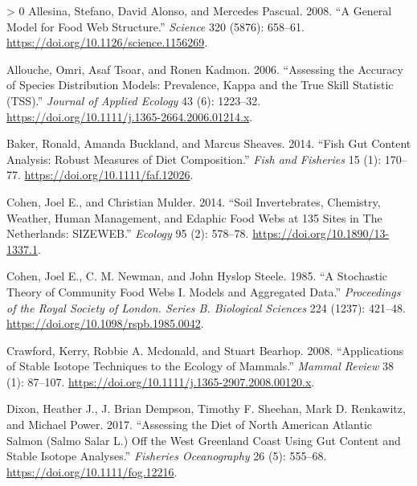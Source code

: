 \documentclass{article}
\newlength{\cslhangindent}
\newenvironment{CSLReferences}[3] %
 {%
  \setlength{\parindent}{0pt}
  \ifodd #1 \everypar{\setlength{\hangindent}{\cslhangindent}}\ignorespaces\fi
  \ifnum #2 > 0
  \setlength{\parskip}{#2\baselineskip}
  \fi
 }%
 {}
\begin{document}
\hypertarget{refs}{}
\begin{CSLReferences}{1}{0}
\leavevmode\hypertarget{ref-allesinaGeneralModelFood2008}{}%
Allesina, Stefano, David Alonso, and Mercedes Pascual. 2008. {``A
{General Model} for {Food Web Structure}.''} \emph{Science} 320 (5876):
658--61. \url{https://doi.org/10.1126/science.1156269}.

\leavevmode\hypertarget{ref-alloucheAssessingAccuracySpecies2006}{}%
Allouche, Omri, Asaf Tsoar, and Ronen Kadmon. 2006. {``Assessing the
Accuracy of Species Distribution Models: Prevalence, Kappa and the True
Skill Statistic ({TSS}).''} \emph{Journal of Applied Ecology} 43 (6):
1223--32. \url{https://doi.org/10.1111/j.1365-2664.2006.01214.x}.

\leavevmode\hypertarget{ref-bakerFishGutContent2014}{}%
Baker, Ronald, Amanda Buckland, and Marcus Sheaves. 2014. {``Fish Gut
Content Analysis: Robust Measures of Diet Composition.''} \emph{Fish and
Fisheries} 15 (1): 170--77. \url{https://doi.org/10.1111/faf.12026}.

\leavevmode\hypertarget{ref-cohenSoilInvertebratesChemistry2014}{}%
Cohen, Joel E., and Christian Mulder. 2014. {``Soil Invertebrates,
Chemistry, Weather, Human Management, and Edaphic Food Webs at 135 Sites
in {The Netherlands}: {SIZEWEB}.''} \emph{Ecology} 95 (2): 578--78.
\url{https://doi.org/10.1890/13-1337.1}.

\leavevmode\hypertarget{ref-cohenStochasticTheoryCommunity1985}{}%
Cohen, Joel E., C. M. Newman, and John Hyslop Steele. 1985. {``A
Stochastic Theory of Community Food Webs {I}. {Models} and Aggregated
Data.''} \emph{Proceedings of the Royal Society of London. Series B.
Biological Sciences} 224 (1237): 421--48.
\url{https://doi.org/10.1098/rspb.1985.0042}.

\leavevmode\hypertarget{ref-crawfordApplicationsStableIsotope2008}{}%
Crawford, Kerry, Robbie A. Mcdonald, and Stuart Bearhop. 2008.
{``Applications of Stable Isotope Techniques to the Ecology of
Mammals.''} \emph{Mammal Review} 38 (1): 87--107.
\url{https://doi.org/10.1111/j.1365-2907.2008.00120.x}.

\leavevmode\hypertarget{ref-dixonAssessingDietNorth2017}{}%
Dixon, Heather J., J. Brian Dempson, Timothy F. Sheehan, Mark D.
Renkawitz, and Michael Power. 2017. {``Assessing the Diet of {North
American Atlantic} Salmon ({Salmo} Salar {L}.) Off the {West Greenland}
Coast Using Gut Content and Stable Isotope Analyses.''} \emph{Fisheries
Oceanography} 26 (5): 555--68. \url{https://doi.org/10.1111/fog.12216}.


\end{CSLReferences}
\end{document}
